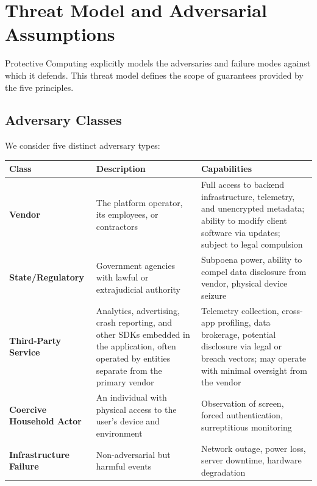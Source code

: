 \documentclass[12pt]{article}
\begin{document}
\section{Threat Model and Adversarial Assumptions}

Protective Computing explicitly models the adversaries and failure modes against which it defends. This threat model defines the scope of guarantees provided by the five principles.

\subsection{Adversary Classes}
We consider five distinct adversary types:

\begin{center}
\begin{tabular}{@{}p{2.8cm}p{4cm}p{5cm}@{}}
\toprule
Class & Description & Capabilities \\
\midrule
\textbf{Vendor} & The platform operator, its employees, or contractors & Full access to backend infrastructure, telemetry, and unencrypted metadata; ability to modify client software via updates; subject to legal compulsion \\
\midrule
\textbf{State/Regulatory} & Government agencies with lawful or extrajudicial authority & Subpoena power, ability to compel data disclosure from vendor, physical device seizure \\
\midrule
\textbf{Third-Party Service} & Analytics, advertising, crash reporting, and other SDKs embedded in the application, often operated by entities separate from the primary vendor & Telemetry collection, cross-app profiling, data brokerage, potential disclosure via legal or breach vectors; may operate with minimal oversight from the vendor \\
\midrule
\textbf{Coercive Household Actor} & An individual with physical access to the user's device and environment & Observation of screen, forced authentication, surreptitious monitoring \\
\midrule
\textbf{Infrastructure Failure} & Non-adversarial but harmful events & Network outage, power loss, server downtime, hardware degradation \\
\bottomrule
\end{tabular}
\end{center}
\end{document}
